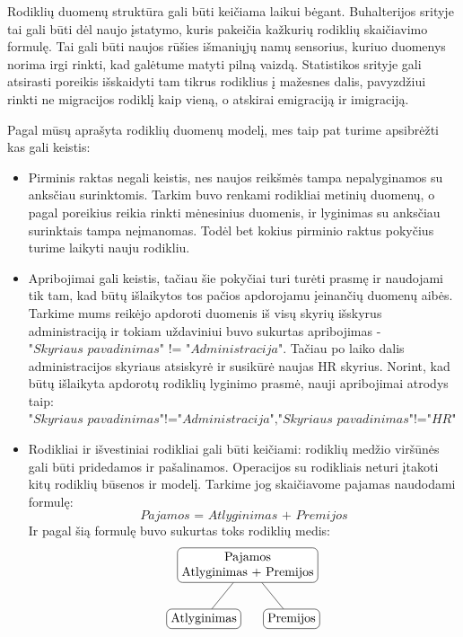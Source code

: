 \documentclass{VUMIFPSbakalaurinis}
\begin{document}
Rodiklių duomenų struktūra gali būti keičiama laikui bėgant. Buhalterijos srityje tai gali būti dėl naujo įstatymo, kuris pakeičia kažkurių rodiklių skaičiavimo formulę. Tai gali būti naujos rūšies išmaniųjų namų sensorius, kuriuo duomenys norima irgi rinkti, kad galėtume matyti pilną vaizdą. Statistikos srityje gali atsirasti poreikis išskaidyti tam tikrus rodiklius į mažesnes dalis, pavyzdžiui rinkti ne migracijos rodiklį kaip vieną, o atskirai emigraciją ir imigraciją. \par
Pagal mūsų aprašyta rodiklių duomenų modelį, mes taip pat turime apsibrėžti kas gali keistis:
\begin{itemize}
    \item Pirminis raktas negali keistis, nes naujos reikšmės tampa nepalyginamos su anksčiau surinktomis. Tarkim buvo renkami rodikliai metinių duomenų, o pagal poreikius reikia rinkti mėnesinius duomenis, ir lyginimas su anksčiau surinktais tampa neįmanomas. Todėl bet kokius pirminio raktus pokyčius turime laikyti nauju rodikliu. 
    \item Apribojimai gali keistis, tačiau šie pokyčiai turi turėti prasmę ir naudojami tik tam, kad būtų išlaikytos tos pačios apdorojamu įeinančių duomenų aibės. Tarkime mums reikėjo apdoroti duomenis iš visų skyrių išskyrus administraciją ir tokiam uždaviniui buvo sukurtas apribojimas - \(\textit{"Skyriaus pavadinimas" != "Administracija"}\). Tačiau po laiko dalis administracijos skyriaus atsiskyrė ir susikūrė naujas HR skyrius. Norint, kad būtų išlaikyta apdorotų rodiklių lyginimo prasmė, nauji apribojimai atrodys taip: \(\textit{"Skyriaus pavadinimas"!="Administracija"}, \textit{"Skyriaus pavadinimas"!="HR"}\)
    \item Rodikliai ir išvestiniai rodikliai gali būti keičiami: rodiklių medžio viršūnės gali būti pridedamos ir pašalinamos. Operacijos su rodikliais neturi įtakoti kitų rodiklių būsenos ir modelį. Tarkime jog skaičiavome pajamas naudodami formulę: \[\textit{Pajamos = Atlyginimas + Premijos}\] Ir pagal šią formulę buvo sukurtas toks rodiklių medis: 
    \[	
        \begin{tikzpicture}[sibling distance=7em,	
            every node/.style = {shape=rectangle, rounded corners,	
                                 draw, align=center,	
                                 top color=white, bottom color=white}]	
            \node {Pajamos\\Atlyginimas + Premijos}	
                    child { node {Atlyginimas} }	
                    child { node {Premijos} } ;	
        \end{tikzpicture} 	
\]
\end{itemize}
\end{document}
